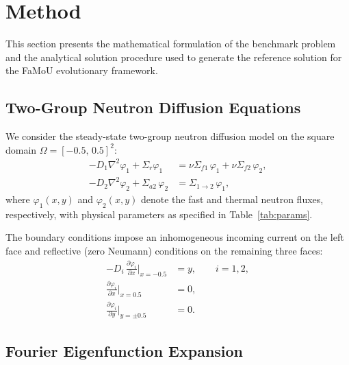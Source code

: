 \section{Method}
\label{sec:method}

This section presents the mathematical formulation of the benchmark problem and the analytical solution procedure used to generate the reference solution for the FaMoU evolutionary framework.

\subsection{Two-Group Neutron Diffusion Equations}
\label{sec:two-group}

We consider the steady-state two-group neutron diffusion model on the square domain $\Omega = [-0.5,\, 0.5]^2$:
\begin{align}
  -D_1 \nabla^2 \varphi_1 + \Sigma_r \varphi_1
    &= \nu\Sigma_{f1}\,\varphi_1 + \nu\Sigma_{f2}\,\varphi_2,
    \label{eq:fast-group} \\[4pt]
  -D_2 \nabla^2 \varphi_2 + \Sigma_{a2}\,\varphi_2
    &= \Sigma_{1\to 2}\,\varphi_1,
    \label{eq:thermal-group}
\end{align}
where $\varphi_1(x,y)$ and $\varphi_2(x,y)$ denote the fast and thermal neutron fluxes, respectively, with physical parameters as specified in Table~\ref{tab:params}.

The boundary conditions impose an inhomogeneous incoming current on the left face and reflective (zero Neumann) conditions on the remaining three faces:
\begin{align}
  -D_i\,\frac{\partial\varphi_i}{\partial x}\bigg|_{x=-0.5} &= y,
  \qquad i=1,2,
  \label{eq:bc-left} \\
  \frac{\partial\varphi_i}{\partial x}\bigg|_{x=0.5} &= 0,
  \label{eq:bc-right} \\
  \frac{\partial\varphi_i}{\partial y}\bigg|_{y=\pm 0.5} &= 0.
  \label{eq:bc-topbot}
\end{align}

\subsection{Fourier Eigenfunction Expansion}
\label{sec:fourier-expansion}

